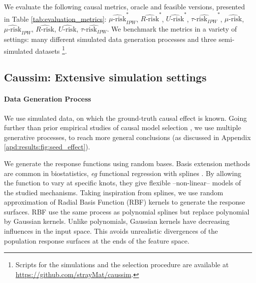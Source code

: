 \documentclass[10pt]{article}
\begin{document}
\begin{multicols}{2}
    We evaluate the following causal metrics, oracle and feasible
    versions, presented in Table
    \ref{tab:evaluation_metrics}:
    $\widehat{\mu\text{-risk}}_{IPW}^*$,
    $\widehat{R\text{-risk}}^*$,
    $\widehat{U\text{-risk}}^*$,
    $\widehat{\tau\text{-risk}_{IPW}}^*$,
    $\widehat{\mu\text{-risk}}$,
    $\widehat{\mu\text{-risk}}_{IPW}$,
    $\widehat{R\text{-risk}}$,
    $\widehat{U\text{-risk}}$,
    $\widehat{\tau\text{-risk}_{IPW}}$.
    We benchmark the metrics in a variety of settings:
    many different simulated data generation
    processes and three semi-simulated datasets \footnote{Scripts for the simulations and the selection procedure are available at
        \url{https://github.com/strayMat/caussim}.
    }.

    \subsection{Caussim: Extensive simulation settings}\label{subsec:simulations}

    \paragraph{Data Generation Process}

    We use simulated data, on which the ground-truth causal effect is known. Going
    further than prior empirical studies of causal model selection
    \cite{schuler_comparison_2018,alaa_validating_2019}, we use multiple
    generative processes, to reach more general conclusions (as discussed
    in Appendix \ref{apd:results:fig:seed_effect}).

    We generate the response functions using random bases.
    Basis extension methods are common in biostatistics, \emph{eg} functional
    regression with splines
    \cite{howe_splines_2011, perperoglou_review_2019}. By allowing the
    function to vary at specific knots, they give flexible --non-linear--
    models of the studied mechanisms. Taking inspiration from splines, we use
    random approximation of Radial Basis Function (RBF) kernels
    \cite{rahimi_random_2008} to generate the response surfaces. RBF use the
    same process as polynomial splines but replace polynomial by Gaussian
    kernels. Unlike polynomials, Gaussian kernels have
    decreasing influences in the input space.
    This avoids unrealistic divergences of the population response surfaces
    at the ends of the feature space.


\end{multicols}
\end{document}
